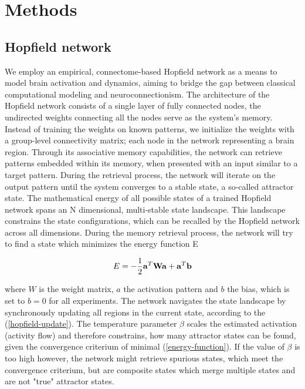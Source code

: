 \documentclass{article}
\begin{document}
\section{Methods}\label{Methods}

\subsection{Hopfield network}\label{Hopfield network}

We employ an empirical, connectome-based Hopfield network as a means to model brain activation and dynamics, aiming to
bridge the gap between classical computational modeling and neuroconnectionism. The architecture of the Hopfield network
\citep{hopfield1982neural} consists of a single layer of fully connected nodes, the undirected weights connecting
all the nodes serve as the system's memory.
Instead of training the weights on known patterns, we initialize the weights with a group-level
connectivity matrix; each node in the network representing a brain region. Through its associative memory capabilities,
the network can retrieve patterns embedded within its memory, when presented with an input similar to a target
pattern. During the retrieval process, the network will iterate on the output pattern until the system converges to a
stable state, a so-called attractor state. The mathematical energy of all possible states of a trained Hopfield network
spans an N dimensional, multi-stable state landscape. This landscape constrains the state configurations, which can be
recalled by the Hopfield network across all dimensions. During the memory retrieval process, the network will try to
find a state which minimizes the energy function E

\begin{equation}
\label{energy-function}
E = - \frac{1}{2}  \bold{a}^{T} \bold{W} \bold{a} + \bold{a}^{T}\bold{b}
\end{equation}

where $W$ is the weight matrix, $a$ the activation pattern and $b$ the bias, which is set to $b = 0$ for all experiments.
The network navigates the state landscape by synchronously updating all regions in the current state, according to the
(\ref{hopfield-update}). The temperature parameter $\beta$ scales the estimated activation (activity flow)
\citep{cole2016activity}and therefore constrains, how many attractor states can be found, given the convergence
criterium of minimal (\ref{energy-function}).
If the value of $\beta$ is too high however, the network might retrieve spurious states,
which meet the convergence criterium, but are composite states which merge multiple states and are not "true"
attractor states.
\end{document}

